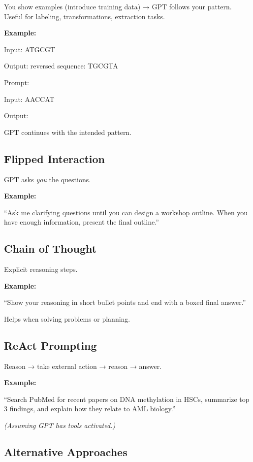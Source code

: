 \documentclass[
  letterpaper,
  DIV=11,
  numbers=noendperiod]{scrreprt}
\begin{document}
You show examples (introduce training data) → GPT follows your pattern.
Useful for labeling, transformations, extraction tasks.

\textbf{Example:}

Input: ATGCGT

Output: reversed sequence: TGCGTA

\hfill\break
Prompt:

Input: AACCAT

Output:

GPT continues with the intended pattern.

\subsection{Flipped Interaction}\label{flipped-interaction}

GPT asks \emph{you} the questions.

\textbf{Example:}

``Ask me clarifying questions until you can design a workshop outline.
When you have enough information, present the final outline.''

\subsection{Chain of Thought}\label{chain-of-thought}

Explicit reasoning steps.

\textbf{Example:}

``Show your reasoning in short bullet points and end with a boxed final
answer.''

Helps when solving problems or planning.

\subsection{ReAct Prompting}\label{react-prompting}

Reason → take external action → reason → answer.

\textbf{Example:}

``Search PubMed for recent papers on DNA methylation in HSCs, summarize
top 3 findings, and explain how they relate to AML biology.''

\emph{(Assuming GPT has tools activated.)}

\subsection{Alternative Approaches}\label{alternative-approaches}
\end{document}
